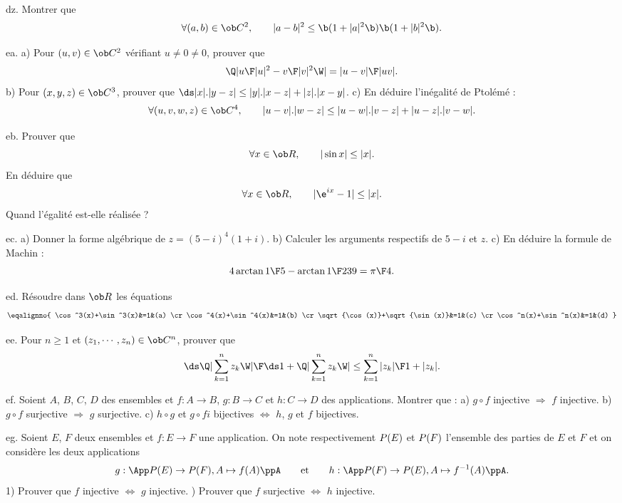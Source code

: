 



\exo [Level=1,Fight=0,Learn=0,Field=\NombresComplexes,Type=\Exercices,Origin=] dz. 
Montrer que 
$$
\forall (a,b)\in\ob C^2,\qquad |a-b|^2\le \b(1+|a|^2\b)\b(1+|b|^2\b).
$$

\exo [Level=1,Fight=3,Learn=2,Field=\NombresComplexes,Type=\Exercices,Origin=] ea. 
a) Pour $(u,v)\in\ob C^2$ vérifiant $u\neq0\neq0$, prouver que 
$$
\Q|{u\F|u|^2}-{v\F|v|^2}\W|={|u-v|\F|uv|}. 
$$
b) Pour $(x,y,z)\in\ob C^3$, prouver que 
$\ds |x|.|y-z|\le |y|.|x-z|+|z|.|x-y|$. 
\pn
c) En déduire l'inégalité de Ptolémé : 
$$
\forall (u,v,w,z)\in\ob C^4, \qquad |u-v|.|w-z|\le |u-w|.|v-z|+|u-z|.|v-w|.
$$

\exo [Level=1,Fight=1,Learn=1,Field=\Trigonométrie,Type=\Exercices,Origin=] eb. 
Prouver que 
$$
\forall x\in\ob R, \qquad |\sin x|\le|x|. 
$$
En déduire que 
$$
\forall x\in\ob R,\qquad |\e^{ix}-1|\le |x|. 
$$
Quand l'égalité est-elle réalisée ?

\exo [Level=1,Fight=2,Learn=1,Field=\NombresComplexes|\Trigonométrie,Type=\Exercices,Origin=] ec. 
a) Donner la forme algébrique de $z=(5-i)^4(1+i)$. \pn
b) Calculer les arguments respectifs de $5-i$ et $z$. \pn
c) En déduire la formule de Machin : 
$$
4\arctan{1\F5}-\arctan{1\F239}={\pi\F4}.
$$

\exo [Level=1,Fight=2,Learn=2,Field=\Trigonométrie,Type=\Exercices,Origin=] ed. 
Résoudre dans $\ob R$ les équations 
$$
\eqalignno{
\cos^3(x)+\sin^3(x)&=1&(a)
\cr
\cos^4(x)+\sin^4(x)&=1&(b)
\cr
\sqrt{\cos(x)}+\sqrt{\sin(x)}&=1&(c)
\cr
\cos^n(x)+\sin^n(x)&=1&(d)
}
$$

\exo [Level=1,Fight=3,Learn=1,Field=\NombresComplexes,Type=\Colles,Origin=] ee. 
Pour $n\ge1$ et $(z_1,\cdots,z_n)\in\ob C^n$, prouver que 
$$
{\ds\Q|\sum_{k=1}^nz_k\W|\F\ds 1+\Q|\sum_{k=1}^nz_k\W|}\le \sum_{k=1}^n{|z_k|\F1+|z_k|}.
$$

\exo [Level=1,Fight=1,Learn=1,Field=\Applications,Type=\Cours,Origin=] ef. 
Soient $A$, $B$, $C$, $D$ des ensembles et $f:A\to B$, $g:B\to C$ et $h:C\to D$ des applications. Montrer que : \pn
a) $g\circ f$ injective $\Longrightarrow$ $f$ injective. \pn
b) $g\circ f$ surjective $\Longrightarrow$ $g$ surjective. \pn
c) $h\circ g$ et $g\circ fi$ bijectives $\Longleftrightarrow$ $h$, $g$ et $f$ bijectives. 

\exo [Level=1,Fight=1,Learn=1,Field=\Applications,Type=\Colles,Origin=] eg. 
Soient $E$, $F$ deux ensembles et $f:E\to F$ une application. 
On note respectivement $\sc P(E)$ et $\sc P(F)$ l'ensemble des parties de $E$ et $F$ et on considère les deux applications 
$$
g:\App\sc P(E)\to\sc P(F), A\mapsto f(A)\ppA\qquad \hbox{et}\qquad h:\App\sc P(F)\to\sc P(E), A\mapsto f^{-1}(A)\ppA. 
$$
1) Prouver que $f$ injective $\Longleftrightarrow$ $g$ injective. ) Prouver que $f$ surjective $\Longleftrightarrow$ $h$ injective. 

